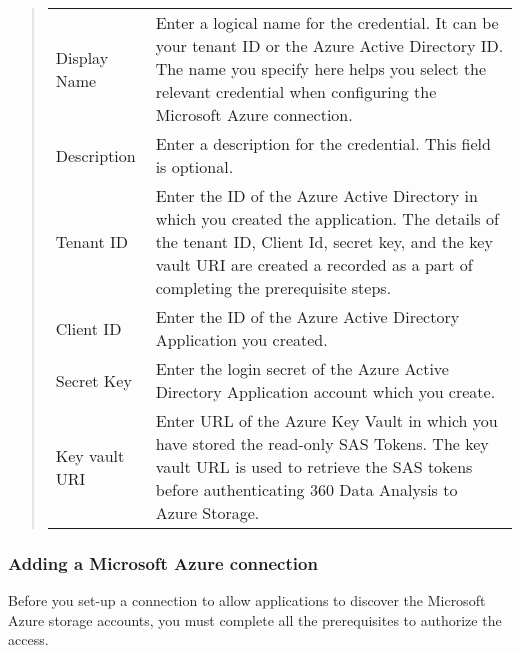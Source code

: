 \documentclass[letterpaper,10pt,english]{sphinxmanual}
\begin{document}
\begin{quote}


\begin{savenotes}\sphinxattablestart
\centering
\begin{tabulary}{\linewidth}[t]{|T|T|}
\hline
{}\relax &\relax \\
\hline
Display Name
&
Enter a logical name for the credential. It can be your tenant ID or
the Azure Active Directory ID. The name you specify here helps you
select the relevant credential when configuring  the Microsoft
Azure connection.
\\
\hline
Description
&
Enter a description for the credential. This field is optional.
\\
\hline
Tenant ID
&
Enter the ID of the Azure Active Directory in which you created the
application.
The details of the tenant ID, Client Id, secret key, and the key vault
URI are created a recorded as a part of completing the prerequisite
steps.
\\
\hline
Client ID
&
Enter the ID of the Azure Active Directory Application you created.
\\
\hline
Secret Key
&
Enter the login secret of the Azure Active Directory Application
account which you create.
\\
\hline
Key vault URI
&
Enter URL of the Azure Key Vault in which you have stored the read-only
SAS Tokens. The key vault URL is used to retrieve the SAS tokens before
authenticating 360 Data Analysis to Azure Storage.
\\
\hline
\end{tabulary}
\par
\sphinxattableend\end{savenotes}
\end{quote}


\subsubsection{Adding a Microsoft Azure connection}
\label{\detokenize{mcdmp_app_ug:adding-a-microsoft-azure-connection}}
Before you set-up a connection to allow applications to discover the Microsoft Azure storage accounts, you must complete all the prerequisites to authorize the access.

{\hyperref[\detokenize{mcdmp_app_ug:prerequisites-azure}]{}}
\end{document}
